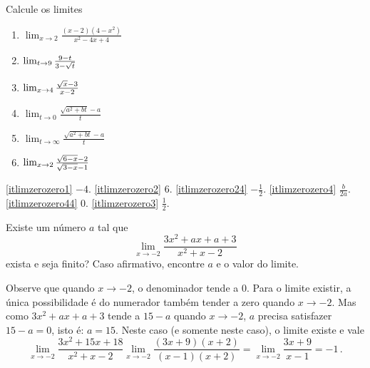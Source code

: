 \begin{exo}  Calcule os limites
\begin{multicols}{3}
\begin{enumerate}
\item\label{itlimzerozero1} $\lim_{x\to 2}\frac{(x-2)(4-x^2)}{x^2-4x+4}$
\item\label{itlimzerozero2} $\lim_{{t}\to {9}}\frac{9-t}{3-\sqrt{t}}$
\item\label{itlimzerozero24} $\lim_{{x}\to {4}}\frac{\sqrt{x}-3}{x-2}$
\item\label{itlimzerozero4} $\lim_{t\to 0}\frac{\sqrt{a^2+bt}-a}{t}$
\item\label{itlimzerozero44} $\lim_{t\to \infty}\frac{\sqrt{a^2+bt}-a}{t}$
\item\label{itlimzerozero3} $\lim_{{x}\to {2}}\frac{\sqrt{6-x}-2}{\sqrt{3-x}-1}$
\end{enumerate}
\end{multicols}
\vspace{0.01cm}
\begin{sol}
\eqref{itlimzerozero1} $-4$.
\eqref{itlimzerozero2} $6$.
\eqref{itlimzerozero24} $-\tfrac12$.
\eqref{itlimzerozero4} $\frac{b}{2a}$. 
\eqref{itlimzerozero44} $0$. 
\eqref{itlimzerozero3} $\tfrac12$. 
\end{sol}
\end{exo}



\begin{exo}
Existe um n\'umero $a$ tal que 
$$
\lim_{x\to -2}\frac{3x^2+ax+a+3}{x^2+x-2}
$$
exista e seja finito? Caso afirmativo, encontre $a$ e o valor do limite.
\begin{sol}
Observe que quando $x\to -2$, o denominador tende a $0$. 
Para o limite existir, a única possibilidade é do numerador também
tender a zero quando $x\to -2$. Mas como $3x^2+ax+a+3$ tende a $15-a$
quando $x\to -2$, $a$ precisa satisfazer $15-a=0$, isto é: $a=15$.
Neste caso (e somente neste caso), o limite existe e vale 
$$
\lim_{x\to -2}\frac{3x^2+15x+18}{x^2+x-2}
\lim_{x\to -2}\frac{(3x+9)(x+2)}{(x-1)(x+2)}=
\lim_{x\to -2}\frac{3x+9}{x-1}=-1\,.
$$
\end{sol}
\end{exo}


